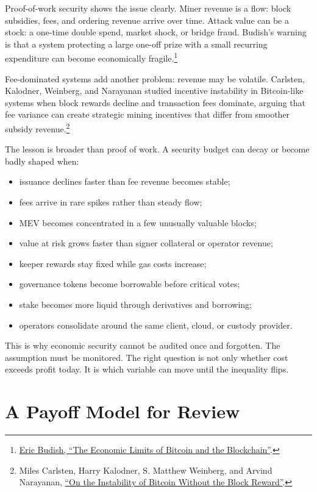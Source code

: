 Proof-of-work security shows the issue clearly. Miner revenue is a flow: block subsidies, fees, and ordering revenue arrive over time. Attack value can be a stock: a one-time double spend, market shock, or bridge fraud. Budish's warning is that a system protecting a large one-off prize with a small recurring expenditure can become economically fragile.\footnote{\href{https://www.nber.org/papers/w24717}{Eric Budish, ``The Economic Limits of Bitcoin and the Blockchain''}.}

Fee-dominated systems add another problem: revenue may be volatile. Carlsten, Kalodner, Weinberg, and Narayanan studied incentive instability in Bitcoin-like systems when block rewards decline and transaction fees dominate, arguing that fee variance can create strategic mining incentives that differ from smoother subsidy revenue.\footnote{Miles Carlsten, Harry Kalodner, S. Matthew Weinberg, and Arvind Narayanan, \href{https://www.cs.princeton.edu/~smattw/CKWN-CCS16.pdf}{``On the Instability of Bitcoin Without the Block Reward''}.}

The lesson is broader than proof of work. A security budget can decay or become badly shaped when:

\begin{itemize}
\item issuance declines faster than fee revenue becomes stable;
\item fees arrive in rare spikes rather than steady flow;
\item MEV becomes concentrated in a few unusually valuable blocks;
\item value at risk grows faster than signer collateral or operator revenue;
\item keeper rewards stay fixed while gas costs increase;
\item governance tokens become borrowable before critical votes;
\item stake becomes more liquid through derivatives and borrowing;
\item operators consolidate around the same client, cloud, or custody provider.
\end{itemize}

This is why economic security cannot be audited once and forgotten. The assumption must be monitored. The right question is not only whether cost exceeds profit today. It is which variable can move until the inequality flips.

\section{A Payoff Model for Review}

